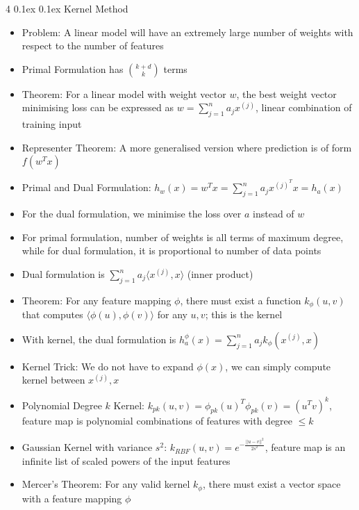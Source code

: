 \documentclass[10pt, landscape]{article}
\makeatletter
\renewcommand{\subsection}{\@startsection{subsection}{2}{0mm}%
  {0.1ex} %
  {0.1ex} %
  {\normalfont\normalsize\bfseries}}
\makeatother
\begin{document}
\begin{multicols*}{4}
\subsection{Kernel Method}
\begin{itemize}
    \item Problem: A linear model will have an extremely large number of weights with respect to the number of features
    \item Primal Formulation has ${k+d \choose k}$ terms
    \item Theorem: For a linear model with weight vector $w$, the best weight vector minimising loss can be expressed as $w=\sum_{j=1}^n a_jx^{(j)}$, linear combination of training input
    \item Representer Theorem: A more generalised version where prediction is of form $f(w^Tx)$
    \item Primal and Dual Formulation: $h_w(x)=w^Tx=\sum_{j=1}^na_jx^{(j)^T}x=h_a(x)$
    \item For the dual formulation, we minimise the loss over $a$ instead of $w$
    \item For primal formulation, number of weights is all terms of maximum degree, while for dual formulation, it is proportional to number of data points
    \item Dual formulation is $\sum_{j=1}^n a_j \langle x^{(j)}, x\rangle$ (inner product)
    \item Theorem: For any feature mapping $\phi$, there must exist a function $k_\phi(u,v)$ that computes $\langle\phi(u), \phi(v)\rangle$ for any $u,v$; this is the kernel
    \item With kernel, the dual formulation is $h_a^\phi(x)=\sum_{j=1}^n a_j k_\phi(x^{(j)}, x)$
    \item Kernel Trick: We do not have to expand $\phi(x)$, we can simply compute kernel between $x^{(j)}, x$
    \item Polynomial Degree $k$ Kernel: $k_{pk}(u, v)=\phi_{pk}(u)^T\phi_{pk}(v)=(u^Tv)^k$, feature map is polynomial combinations of features with degree $\leq k$
    \item Gaussian Kernel with variance $s^2$: $k_{RBF}(u, v)=e^{-\frac{||u-v||^2}{2s^2}}$, feature map is an infinite list of scaled powers of the input features
    \item Mercer's Theorem: For any valid kernel $k_\phi$, there must exist a vector space with a feature mapping $\phi$
\end{itemize}


\end{multicols*}
\end{document}
